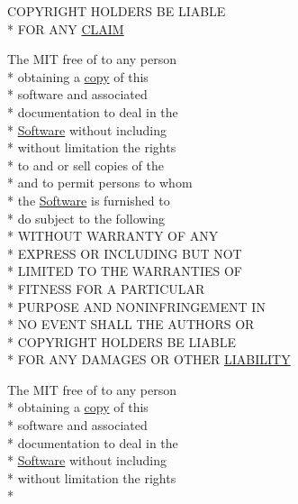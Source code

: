 \begin{DoxyCompactItemize}
C\-O\-P\-Y\-R\-I\-G\-H\-T H\-O\-L\-D\-E\-R\-S B\-E L\-I\-A\-B\-L\-E \\*
F\-O\-R A\-N\-Y \hyperlink{LICENSE_8txt_a6748037be7bf72df72169eafdc8c492e}{C\-L\-A\-I\-M}
\item 
The M\-I\-T free of to any person \\*
obtaining a \hyperlink{LICENSE_8txt_aff1d4c6b756ebf691fa44a0904f68658}{copy} of this \\*
software and associated \\*
documentation to deal in the \\*
\hyperlink{LICENSE_8txt_a22a1529885b3e9d66b0c72fe604fc3dc}{Software} without including \\*
without limitation the rights \\*
to and or sell copies of the \\*
and to permit persons to whom \\*
the \hyperlink{LICENSE_8txt_a22a1529885b3e9d66b0c72fe604fc3dc}{Software} is furnished to \\*
do subject to the following \\*
W\-I\-T\-H\-O\-U\-T W\-A\-R\-R\-A\-N\-T\-Y O\-F A\-N\-Y \\*
E\-X\-P\-R\-E\-S\-S O\-R I\-N\-C\-L\-U\-D\-I\-N\-G B\-U\-T N\-O\-T \\*
L\-I\-M\-I\-T\-E\-D T\-O T\-H\-E W\-A\-R\-R\-A\-N\-T\-I\-E\-S O\-F \\*
F\-I\-T\-N\-E\-S\-S F\-O\-R A P\-A\-R\-T\-I\-C\-U\-L\-A\-R \\*
P\-U\-R\-P\-O\-S\-E A\-N\-D N\-O\-N\-I\-N\-F\-R\-I\-N\-G\-E\-M\-E\-N\-T I\-N \\*
N\-O E\-V\-E\-N\-T S\-H\-A\-L\-L T\-H\-E A\-U\-T\-H\-O\-R\-S O\-R \\*
C\-O\-P\-Y\-R\-I\-G\-H\-T H\-O\-L\-D\-E\-R\-S B\-E L\-I\-A\-B\-L\-E \\*
F\-O\-R A\-N\-Y D\-A\-M\-A\-G\-E\-S O\-R O\-T\-H\-E\-R \hyperlink{LICENSE_8txt_a154c0f6f925190567752588d1ff5458f}{L\-I\-A\-B\-I\-L\-I\-T\-Y}
\item 
The M\-I\-T free of to any person \\*
obtaining a \hyperlink{LICENSE_8txt_aff1d4c6b756ebf691fa44a0904f68658}{copy} of this \\*
software and associated \\*
documentation to deal in the \\*
\hyperlink{LICENSE_8txt_a22a1529885b3e9d66b0c72fe604fc3dc}{Software} without including \\*
without limitation the rights \\*

\end{DoxyCompactItemize}
